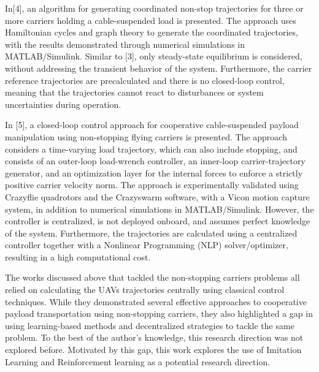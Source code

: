 In[4], an algorithm for generating coordinated non-stop trajectories for 
three or more carriers holding a cable-suspended load is presented. 
The approach uses Hamiltonian cycles and graph theory to generate the 
coordinated trajectories, with the results demonstrated through numerical 
simulations in MATLAB/Simulink. Similar to [3], only steady-state equilibrium is 
considered, without addressing the transient behavior of the system. 
Furthermore, the carrier reference trajectories are precalculated and there 
is no closed-loop control, meaning that the trajectories cannot react to 
disturbances or system uncertainties during operation.



In [5], a closed-loop control approach for cooperative cable-suspended 
payload manipulation using non-stopping flying carriers is presented. The 
approach considers a time-varying load trajectory, which can also include 
stopping, and consists of an outer-loop load-wrench controller, an inner-loop 
carrier-trajectory generator, and an optimization layer for the internal 
forces to enforce a strictly positive carrier velocity norm. The approach 
is experimentally validated using Crazyflie quadrotors and the Crazyswarm 
software, with a Vicon motion capture system, in addition to numerical 
simulations in MATLAB/Simulink. However, the controller is centralized,
is not deployed onboard, and assumes perfect knowledge of the system.
Furthermore, the trajectories are calculated using a
centralized controller together with a Nonlinear Programming (NLP) 
solver/optimizer, resulting in a high computational cost.


The works discussed above that tackled the non-stopping carriers problems all 
relied on calculating the UAVs trajectories centrally using classical 
control techniques. While they demonstrated several effective approaches to
cooperative payload transportation using non-stopping carriers, they also 
highlighted a gap in using learning-based methods and decentralized strategies 
to tackle the same problem. To the best of the author's knowledge, this 
research direction was not explored before. Motivated 
by this gap, this work explores the use of Imitation Learning and 
Reinforcement learning as a potential research direction.
